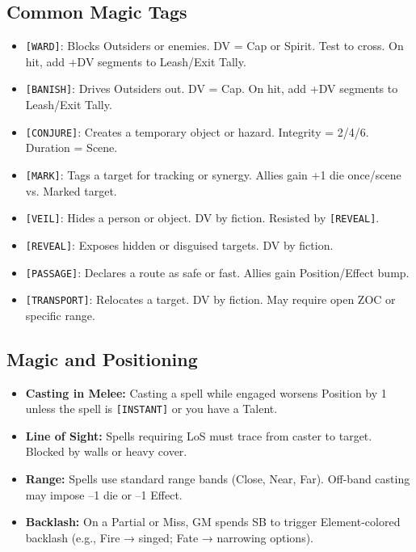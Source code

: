 \documentclass[11pt]{article}
\newcommand{\Tag}[1]{\texttt{[#1]}}
\begin{document}
\subsection{Common Magic Tags}
\begin{itemize}
  \item \Tag{WARD}: Blocks Outsiders or enemies. DV = Cap or Spirit. Test to cross. On hit, add +DV segments to Leash/Exit Tally.
  \item \Tag{BANISH}: Drives Outsiders out. DV = Cap. On hit, add +DV segments to Leash/Exit Tally.
  \item \Tag{CONJURE}: Creates a temporary object or hazard. Integrity = 2/4/6. Duration = Scene.
  \item \Tag{MARK}: Tags a target for tracking or synergy. Allies gain +1 die once/scene vs. Marked target.
  \item \Tag{VEIL}: Hides a person or object. DV by fiction. Resisted by \Tag{REVEAL}.
  \item \Tag{REVEAL}: Exposes hidden or disguised targets. DV by fiction.
  \item \Tag{PASSAGE}: Declares a route as safe or fast. Allies gain Position/Effect bump.
  \item \Tag{TRANSPORT}: Relocates a target. DV by fiction. May require open ZOC or specific range.
\end{itemize}

\subsection{Magic and Positioning}
\begin{itemize}
  \item \textbf{Casting in Melee:} Casting a spell while engaged worsens Position by 1 unless the spell is \Tag{INSTANT} or you have a Talent.
  \item \textbf{Line of Sight:} Spells requiring LoS must trace from caster to target. Blocked by walls or heavy cover.
  \item \textbf{Range:} Spells use standard range bands (Close, Near, Far). Off-band casting may impose –1 die or –1 Effect.
  \item \textbf{Backlash:} On a Partial or Miss, GM spends SB to trigger Element-colored backlash (e.g., Fire → singed; Fate → narrowing options).
\end{itemize}
\end{document}
